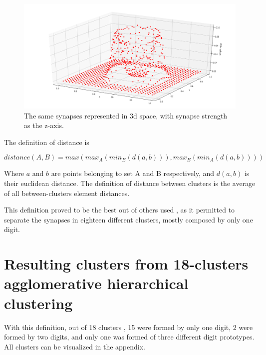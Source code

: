 \documentclass[a4paper]{report}
\begin{document}
\begin{figure} [H]
    \centering
    \includegraphics [width=12cm ] {o/zero_three.png}
    \caption{The same synapses represented in 3d space, with synapse strength as the z-axis.}
    \label{zero_three}
\end{figure}

The definition of distance  is

\begin{equation}
    distance(A, B) = max(max_A(min_B(d(a,b))), max_B(min_A(d(a,b))))
\end{equation}

Where $a$ and $b$ are points belonging to set A and B respectively, and $d(a,b)$ is their euclidean distance.
The definition of distance between clusters is the average of all between-clusters element distances.

This definition proved to be the best out of others used , as it permitted to separate the synapses in eighteen different clusters, mostly composed by only one digit.



\section{Resulting clusters from 18-clusters agglomerative hierarchical clustering}

With this definition, out of 18 clusters , 15 were formed by only one digit, 2 were formed by two digits, and only one was formed of three different digit prototypes.
All clusters can be visualized in the appendix. 
\end{document}
